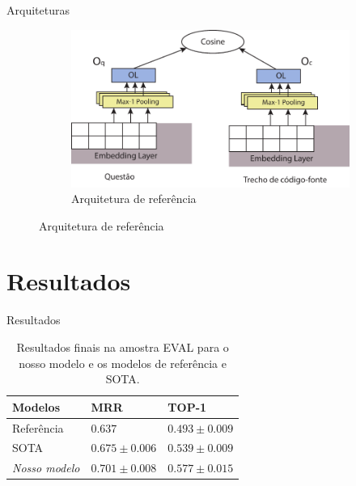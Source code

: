 \documentclass[10pt]{beamer}
\begin{document}
\begin{frame}{Arquiteturas}
\begin{figure}
          \begin{subfigure}[h]{0.45\textwidth}
            \includegraphics[width=\textwidth]{figuras/embedding-architecture.pdf}
            \caption{Arquitetura de referência}
            \label{fig:baseline-one-architecture}
          \end{subfigure}
        \end{figure}
\end{frame}



\section{Resultados}


\begin{frame}{Resultados}
\begin{table}[!b]
\footnotesize
  \begin{tabularx}{\textwidth}{XXX}
 \toprule
 \textbf{Modelos} & \textbf{MRR} & \textbf{TOP-1}\\
 \toprule
 Referência & $0.637$& $0.493 \pm 0.009$\\
 
 \bottomrule
 
 SOTA & $0.675 \pm 0.006$ & $0.539 \pm 0.009$\\
 
 \bottomrule
 
\textit{Nosso modelo} & $0.701 \pm 0.008$ & $0.577 \pm 0.015$\\
 
\bottomrule
\end{tabularx}
\caption{Resultados finais na amostra EVAL para o nosso modelo e os modelos de referência e SOTA. }
\label{table:resultados}
\end{table}
\end{frame}
\end{document}
